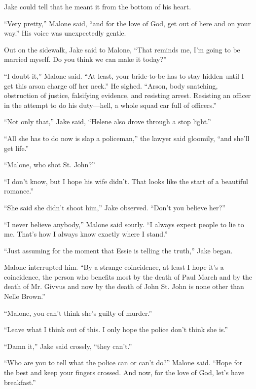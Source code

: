 \documentclass{novel}
\begin{document}
Jake could tell that he meant it from the bottom of his heart.

“Very pretty,” Malone said, “and for the love of God, get out of here and on your way.” His voice was unexpectedly gentle.

Out on the sidewalk, Jake said to Malone, “That reminds me, I’m going to be married myself. Do you think we can make it today?”

“I doubt it,” Malone said. “At least, your bride-to-be has to stay hidden until I get this arson charge off her neck.” He sighed. “Arson, body snatching, obstruction of justice, falsifying evidence, and resisting arrest. Resisting an officer in the attempt to do his duty—hell, a whole squad car full of officers.”

“Not only that,” Jake said, “Helene also drove through a stop light.”

“All she has to do now is slap a policeman,” the lawyer said gloomily, “and she’ll get life.”

“Malone, who shot St. John?”

“I don’t know, but I hope his wife didn’t. That looks like the start of a beautiful romance.”

“She said she didn’t shoot him,” Jake observed. “Don’t you believe her?”

“I never believe anybody,” Malone said sourly. “I always expect people to lie to me. That’s how I always know exactly where I stand.”

“Just assuming for the moment that Essie is telling the truth,” Jake began.

Malone interrupted him. “By a strange coincidence, at least I hope it’s a coincidence, the person who benefits most by the death of Paul March and by the death of Mr. Givvus and now by the death of John St. John is none other than Nelle Brown.”

“Malone, you can’t think she’s guilty of murder.”

“Leave what I think out of this. I only hope the police don’t think she is.”

“Damn it,” Jake said crossly, “they can’t.”

“Who are you to tell what the police can or can’t do?” Malone said. “Hope for the best and keep your fingers crossed. And now, for the love of God, let’s have breakfast.”

\vspace{2\nbs}
\clearpage
\thispagestyle{empty}
\end{document}
